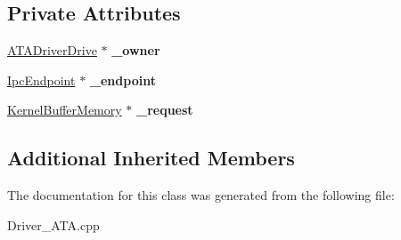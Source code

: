 \subsection*{Private Attributes}
\begin{DoxyCompactItemize}
\item 
\mbox{\label{class_a_t_a_driver_drive_1_1_request_a6052bdfa39103ac0832e43b10a5c5b3e}} 
\hyperlink{class_a_t_a_driver_drive}{A\+T\+A\+Driver\+Drive} $\ast$ {\bfseries \+\_\+owner}
\item 
\mbox{\label{class_a_t_a_driver_drive_1_1_request_a9f77cfd6f119cfb0d41018836e810bab}} 
\hyperlink{class_ipc_endpoint}{Ipc\+Endpoint} $\ast$ {\bfseries \+\_\+endpoint}
\item 
\mbox{\label{class_a_t_a_driver_drive_1_1_request_ad561fa8506cd7f31d0b0c475e0958372}} 
\hyperlink{class_kernel_buffer_memory}{Kernel\+Buffer\+Memory} $\ast$ {\bfseries \+\_\+request}
\end{DoxyCompactItemize}
\subsection*{Additional Inherited Members}


The documentation for this class was generated from the following file\+:\begin{DoxyCompactItemize}
\item 
Driver\+\_\+\+A\+T\+A.\+cpp\end{DoxyCompactItemize}
